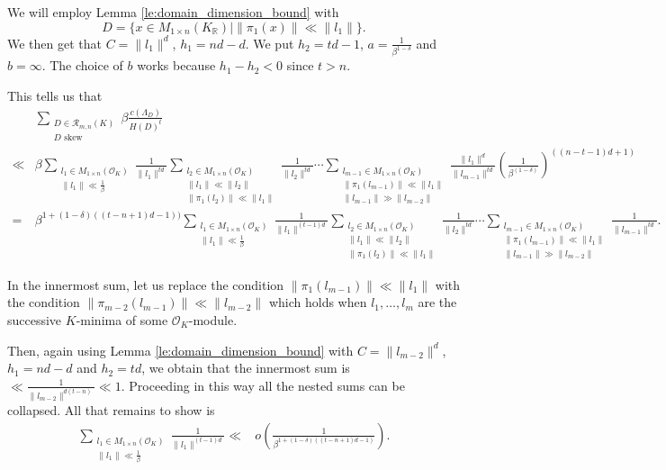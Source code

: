 \documentclass{amsart}
\newcommand{\OK}{\mathcal{O}_K}
\begin{document}
We will employ Lemma \ref{le:domain_dimension_bound} with 
\begin{equation}
  D = \{ x\in M_{1 \times n}(K_\mathbb{R}) \mid \|\pi_1(x)\| \ll \|l_1 \|\}.
\end{equation}
We then get that $C  = \|l_1\|^{d}$, $h_1 = nd-d$. We put $h_2 = td-1 $, $a=\tfrac{1}{\beta^{1-\delta}}$ and $b = \infty$. The choice of $b$ works because $h_1 - h_2 < 0$ since $t>n$.

This tells us that 
{\smaller\begin{align}
	& \sum_{\substack{D \in \mathcal{R}_{m,n}(K) \\   D \text{ skew} }}
\beta	\frac{  c(\Lambda_D) }{ H(D)^{t} } \\
	\ll & \beta
	\sum_{ \substack{l_1 \in M_{1 \times n}(\OK)  \\ \|l_1\| \ll \tfrac{1}{\beta}  }}  \frac{1}{\|l_1\|^{ td }}
	\sum_{ \substack{l_2 \in M_{1 \times n}(\OK) \\ \|l_1\| \ll \|l_2\|  \\ \|\pi_{1}(l_2)\| \ll \|l_1\|   }}  
	\frac{1}{\|l_2\|^{td}}
	\cdots
	\sum_{ \substack{l_{m-1} \in M_{1 \times n}(\OK)  \\ \|\pi_1(l_{m-1})\| \ll \|l_1\| \\ \|l_{m-1}\| \gg \|l_{m-2}\| }}  
	\frac{\|l_1\|^{d} }{ \|l_{m-1}\|^{td} }
	\left( \frac{1}{\beta^{(1-\delta)}}\right)^ {((n-t-1)d + 1)} \\
	=
	    & \beta^{ 1+ (1-\delta)((t-n+1)d - 1)  )}
	\sum_{ \substack{l_1 \in M_{1 \times n}(\OK)  \\ \|l_1\| \ll \tfrac{1}{\beta}  }}  \frac{1}{\|l_1\|^{ (t-1)d }}
	\sum_{ \substack{l_2 \in M_{1 \times n}(\OK) \\ \|l_1\| \ll \|l_2\|  \\ \|\pi_{1}(l_2)\| \ll \|l_1\|   }}  
	\frac{1}{\|l_2\|^{td}}
	\cdots
	\sum_{ \substack{l_{m-1} \in M_{1 \times n}(\OK)  \\ \|\pi_1(l_{m-1})\| \ll \|l_1\| \\ \|l_{m-1}\| \gg \|l_{m-2}\| }}  
	\frac{1}{ \|l_{m-1}\|^{td} }
	.
\end{align}}

In the innermost sum, let us replace the condition $\|\pi_{1}( l_{m-1} )\| \ll \| l_{1}\|$ with the condition
$\|\pi_{m-2}( l_{m-1} )\| \ll \| l_{m-2}\|$ which holds when $l_1,\dots,l_m$ are the successive $K$-minima of some $\OK$-module.

Then, again using Lemma \ref{le:domain_dimension_bound} with $C = \|l_{m-2}\|^{d}$, $h_1 = nd-d$ and $h_2 = td $, we obtain that the innermost sum is $\ll \tfrac{1}{\|l_{m-2}\|^{d(t-n)}} \ll 1$.
Proceeding in this way all the nested sums can be collapsed. All that remains to show is 
\begin{align}
	\sum_{ \substack{l_1 \in M_{1 \times n}(\OK)  \\ \|l_1\| \ll \tfrac{1}{\beta}  }}  \frac{1}{\|l_1\|^{ (t-1)d }}
	\ll 
	    & o\left(\frac{1}{\beta^{1+ (1-\delta)((t-n+1)d - 1)} }\right) .
\end{align}
\end{document}
